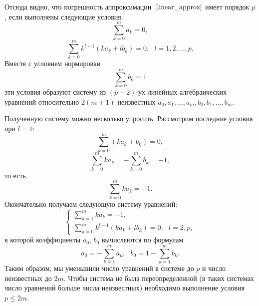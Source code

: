\documentclass[11pt,a4paper,twoside]{report}
\numberwithin{equation}{section}
\theoremstyle{definition}
\theoremstyle{plain}
\begin{document}
Отсюда видно, что погрешность аппроксимации~$\eqref{linear_approx}$ имеет
порядок $p$, если выполнены следующие условия:
%
$$
    \sum_{k=0}^{m}a_k=0,
$$
%
$$
    \sum_{k=0}^m k^{l-1}(ka_k+lb_k)=0,~~~l=1,2,\ldots,p.
$$
%
Вместе с условием нормировки
%
$$
    \sum_{k=0}^m b_k=1
$$
%
эти условия образуют систему из $(p+2)$-ух линейных алгебраических уравнений относительно
$2(m+1)$ неизвестных $a_0,a_1,\ldots,a_m,b_0,b_1,\ldots,b_m$.

Полученную систему можно несколько упросить. Рассмотрим последние условия при $l=1$:
%
$$
    \sum\limits_{k=0}^m (ka_k+b_k)=0,
$$
%
$$
    \sum\limits_{k=0}^m ka_k = -\sum_{k=0}^m b_k = -1,
$$
%
то есть
%
$$
    \sum\limits_{k=0}^m ka_k = -1.
$$
%
Окончательно получаем следующую систему уравнений:
%
\begin{equation}
    \label{multi_step_res_system}
    \begin{cases}
        \sum\limits_{k=1}^m ka_k = -1, \\
        \sum\limits_{k=0}^m k^{l-1}(ka_k+lb_k)=0,~~~l=\overline{2,p},
    \end{cases}
\end{equation}
в которой коэффициенты $a_0$, $b_0$ вычисляются по формулам
%
$$
    a_0 = -\sum_{k=1}^ma_k, ~~~b_0 = 1-\sum_{k=1}^mb_k.
$$
%
Таким образом, мы уменьшили число уравнений в системе до $p$ и
число неизвестных до $2m$. Чтобы система не была переопределенной
(в таких системах число уравнений больше числа неизвестных)
необходимо выполнение условия $p \leqslant 2m$.
\end{document}
